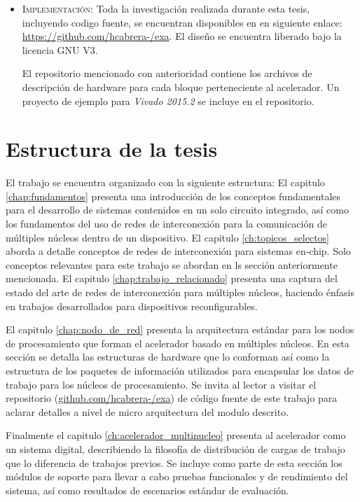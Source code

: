 \begin{itemize}
			\item 	\textsc{Implementación}: Toda la investigación realizada durante esta tesis, incluyendo codigo fuente, se encuentran disponibles en en siguiente enlace: \href{https://github.com/hcabrera-/lancetfish}{https://github.com/hcabrera-/exa}. El diseño se encuentra liberado bajo la licencia GNU V3\cite{chapter0:gplv3}.

			El repositorio mencionado con anterioridad contiene los archivos de descripción de hardware para cada bloque perteneciente al acelerador. Un proyecto de ejemplo para \textit{Vivado 2015.2}\cite{chapter0:Vivado:Xilinx} se incluye en el repositorio.

		\end{itemize}

\section{Estructura de la tesis}
	\label{estructura}

El trabajo se encuentra organizado con la siguiente estructura: El capitulo \ref{chap:fundamentos} presenta una introducción de los conceptos fundamentales para el desarrollo de sistemas contenidos en un solo circuito integrado, así como los fundamentos del uso de redes de interconexión para la comunicación de múltiples núcleos dentro de un dispositivo. El capitulo \ref{ch:topicos_selectos} aborda a detalle conceptos de redes de interconexión para sistemas en-chip. Solo conceptos relevantes para este trabajo se abordan en ls sección anteriormente mencionada. El capitulo \ref{chap:trabajo_relacionado} presenta una captura del estado del arte de redes de interconexión para múltiples núcleos, haciendo énfasis en trabajos desarrollados para dispositivos reconfigurables.

El capitulo \ref{chap:nodo_de_red} presenta la arquitectura estándar para los nodos de procesamiento que forman el acelerador basado en múltiples núcleos. En esta sección se detalla las estructuras de hardware que lo conforman así como la estructura de los paquetes de información utilizados para encapsular los datos de trabajo para los núcleos de procesamiento. Se invita al lector a visitar el repositorio (\href{https://github.com/hcabrera-/exa}{github.com/hcabrera-/exa}) de código fuente de este trabajo para aclarar detalles a nivel de micro arquitectura del modulo descrito.

Finalmente el capitulo \ref{ch:acelerador_multinucleo} presenta al acelerador como un sistema digital, describiendo la filosofía de distribución de cargas de trabajo que lo diferencia de trabajos previos. Se incluye como parte de esta sección los módulos de soporte para llevar a cabo pruebas funcionales y de rendimiento del sistema, así como resultados de escenarios estándar de evaluación.


